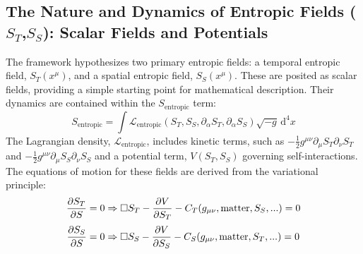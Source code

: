 \documentclass[11pt,a4paper]{article} %
\newcommand{\ST}{S_T}
\newcommand{\SSp}{S_S} %
\newcommand{\Sentropic}{S_{\text{entropic}}}
\begin{document}
\subsection{The Nature and Dynamics of Entropic Fields ($\ST$,$\SSp$): Scalar Fields and Potentials}
\label{sec:Nature_Dynamics}
The framework hypothesizes two primary entropic fields: a temporal entropic field, $\ST(x^\mu)$, and a spatial entropic field, $\SSp(x^\mu)$. These are posited as scalar fields, providing a simple starting point for mathematical description. Their dynamics are contained within the $\Sentropic$ term:
\begin{equation}
\label{eq:Sentropic}
\Sentropic=\int\mathcal{L}_{\text{entropic}}(\ST,\SSp,\partial_\alpha\ST,\partial_\alpha\SSp)\sqrt{-g}\,\text{d}^4x
\end{equation}
The Lagrangian density, $\mathcal{L}_{\text{entropic}}$, includes kinetic terms, such as $-\frac{1}{2}g^{\mu\nu}\partial_\mu\ST\partial_\nu\ST$ and $-\frac{1}{2}g^{\mu\nu}\partial_\mu\SSp\partial_\nu\SSp$ and a potential term, $V(\ST,\SSp)$ governing self-interactions. The equations of motion for these fields are derived from the variational principle\cite{Hilbert1916}:
\begin{equation}
\label{eq:ST_eom}
\pdv{\ST}{S}=0\Rightarrow\Box\ST-\pdv{V}{\ST}-C_T(g_{\mu\nu},\text{matter},\SSp,...)=0
\end{equation}
\begin{equation}
\label{eq:SS_eom}
\pdv{\SSp}{S}=0\Rightarrow\Box\SSp-\pdv{V}{\SSp}-C_S(g_{\mu\nu},\text{matter},\ST,...)=0
\end{equation}
\end{document}
